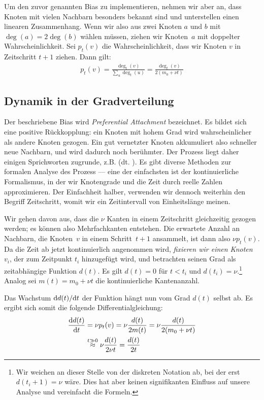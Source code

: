 Um den zuvor genannten Bias zu implementieren, nehmen wir aber an, dass Knoten mit vielen Nachbarn besonders bekannt sind und unterstellen einen linearen Zusammenhang.
Wenn wir also aus zwei Knoten $a$ und $b$ mit $\deg(a) = 2\deg(b)$ wählen müssen, ziehen wir Knoten~$a$ mit doppelter Wahrscheinlichkeit.
Sei $p_t(v)$ die Wahrscheinlichkeit, dass wir Knoten $v$ in Zeitschritt $t + 1$ ziehen.
Dann gilt:
\begin{align}
    p_t(v) = \frac{\deg_t(v)}{\sum_u  \deg_t(u)} = \frac{\deg_t(v)}{2(m_0 + \nu t)}
\end{align}

\subsection{Dynamik in der Gradverteilung}
Der beschriebene Bias wird \emph{Preferential Attachment} bezeichnet.
Es bildet sich eine positive Rückkopplung:
ein Knoten mit hohem Grad wird wahrscheinlicher als andere Knoten gezogen.
Ein gut vernetzter Knoten akkumuliert also schneller neue Nachbarn, und wird dadurch noch berühmter.
Der Prozess liegt daher einigen Sprichworten zugrunde, z.B.  (dt. ).
Es gibt diverse Methoden zur formalen Analyse des Prozess --- eine der einfachsten ist der kontinuierliche Formalismus, in der wir Knotengrade und die Zeit durch reelle Zahlen approximieren.
Der Einfachheit halber, verwenden wir dennoch weiterhin den Begriff Zeitschritt, womit wir ein Zeitintervall von Einheitslänge meinen.

Wir gehen davon aus, dass die $\nu$ Kanten in einem Zeitschritt gleichzeitig gezogen werden;
es können also Mehrfachkanten entstehen.
Die erwartete Anzahl an Nachbarn, die Knoten~$v$ in einem Schritt~$t+1$ ansammelt, ist dann also $\nu p_t(v)$.
Da die Zeit ab jetzt kontinuierlich angenommen wird, \emph{fixieren wir einen Knoten $v_i$}, der zum Zeitpunkt $t_i$ hinzugefügt wird, und betrachten seinen Grad als zeitabhängige Funktion $d(t)$.
Es gilt $d(t) = 0$ für $t < t_i$ und $d(t_i) = \nu$.\footnote{
    Wir weichen an dieser Stelle von der diskreten Notation ab, bei der erst $d(t_i + 1) = \nu$ wäre.
    Dies hat aber keinen signifikanten Einfluss auf unsere Analyse und vereinfacht die Formeln.
}
Analog sei $m(t) = m_0 + \nu t$ die kontinuierliche Kantenanzahl.

Das Wachstum $\text d d(t) / \text d t$ der Funktion hängt nun vom Grad $d(t)$ selbst ab.
Es ergibt sich somit die folgende Differentialgleichung:
\begin{align}
    \frac{\text d d(t)}{\text d t}
     & = \nu p_t(v)
    = \nu \frac{d(t)}{2 m(t)}
    = \nu \frac{d(t)}{2(m_0 + \nu t)}                                         \\
     & \stackrel{t \gg 0}{\approx} \nu \frac{d(t)}{2 \nu t} = \frac{d(t)}{2t}
\end{align}

